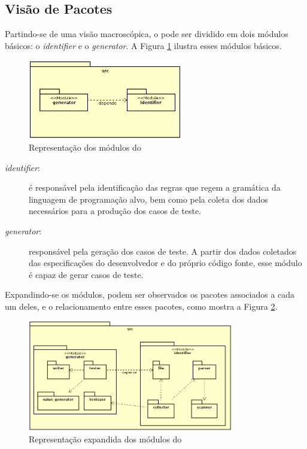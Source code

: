 \subsection{Visão de Pacotes}
Partindo-se de uma visão macroscópica, o \scarefault pode ser dividido em
dois módulos básicos: o \textit{identifier} e o \textit{generator}. A Figura
\ref{modules-scarefault} ilustra esses módulos básicos.

\begin{figure}[h]
  \centering
    \includegraphics[width=0.6\textwidth]{figuras/modules-scarefault.png}
    \caption{Representação dos módulos do \scarefault}
    \label{modules-scarefault}
\end{figure}
\FloatBarrier

\begin{description}
\item[\textit{identifier}:] é responsável pela identificação das regras que regem
a gramática da linguagem de programação alvo, bem como pela coleta dos dados
necessários para a produção dos casos de teste.
\item[\textit{generator}:] responsável pela geração dos casos de teste. A partir dos dados
coletados das especificações do desenvolvedor e do próprio código fonte, esse
módulo é capaz de gerar casos de teste.
\end{description}

Expandindo-se os módulos, podem ser observados os pacotes associados a cada um deles,
e o relacionamento entre esses pacotes, como mostra a Figura
\ref{expand-modules-scarefault-1}.

\begin{figure}[h]
  \centering
    \includegraphics[width=0.8\textwidth]{figuras/expand-modules-scarefault-1.png}
    \caption{Representação expandida dos módulos do \scarefault}
    \label{expand-modules-scarefault-1}
\end{figure}


